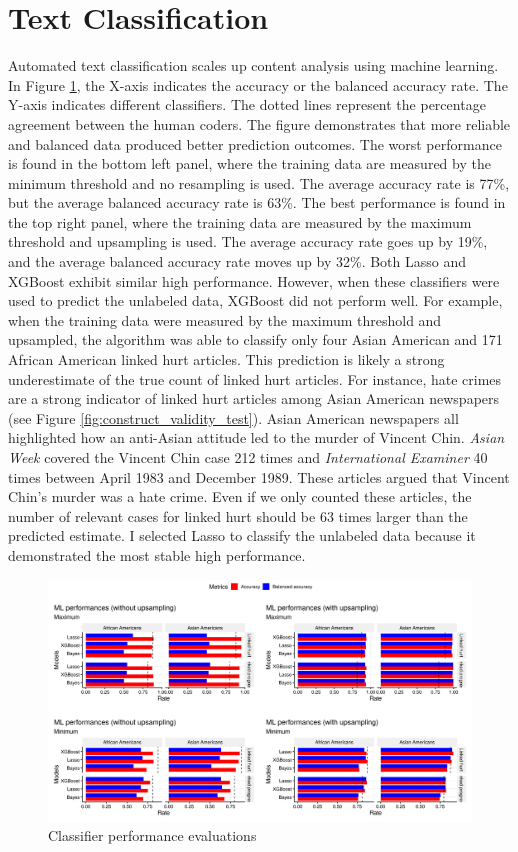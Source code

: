 \documentclass[12 pt]{article}
\begin{document}
\section{Text Classification}
Automated text classification scales up content analysis using machine learning. In Figure \ref{fig:ml_performance_evaluation}, the X-axis indicates the accuracy or the balanced accuracy rate. The Y-axis indicates different classifiers. The dotted lines represent the percentage agreement between the human coders. The figure demonstrates that more reliable and balanced data produced better prediction outcomes. The worst performance is found in the bottom left panel, where the training data are measured by the minimum threshold and no resampling is used. The average accuracy rate is 77\%, but the average balanced accuracy rate is 63\%. The best performance is found in the top right panel, where the training data are measured by the maximum threshold and upsampling is used. The average accuracy rate goes up by 19\%, and the average balanced accuracy rate moves up by 32\%. Both Lasso and XGBoost exhibit similar high performance. However, when these classifiers were used to predict the unlabeled data, XGBoost did not perform well. For example, when the training data were measured by the maximum threshold and upsampled, the algorithm was able to classify only four Asian American and 171 African American linked hurt articles. This prediction is likely a strong underestimate of the true count of linked hurt articles. For instance, hate crimes are a strong indicator of linked hurt articles among Asian American newspapers (see Figure \ref{fig:construct_validity_test}). Asian American newspapers all highlighted how an anti-Asian attitude led to the murder of Vincent Chin. \textit{Asian Week} covered the Vincent Chin case 212 times and \textit{International Examiner} 40 times between April 1983 and December 1989. These articles argued that Vincent Chin's murder was a hate crime. Even if we only counted these articles, the number of relevant cases for linked hurt should be 63 times larger than the predicted estimate. I selected Lasso to classify the unlabeled data because it demonstrated the most stable high performance.

\begin{figure}[htbp!]
    \centering
    \includegraphics[width=1\linewidth]{ml_content_comp.png}
    \caption{Classifier performance evaluations}
    \label{fig:ml_performance_evaluation}
\end{figure}
\end{document}

